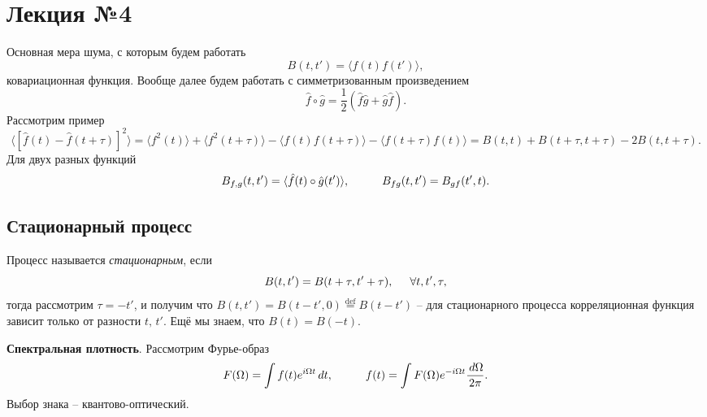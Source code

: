\section{Лекция №4}


Основная мера шума, с которым будем работать
\begin{equation*}
	B(t, t') = \langle f(t) f(t') \rangle,
\end{equation*}
ковариационная функция. Вообще далее будем работать с симметризованным произведением
\begin{equation*}
	\hat{f} \circ \hat{g} = \frac{1}{2}\left(\hat{f} \hat{g} + \hat{g} \hat{f}\right).
\end{equation*}
Рассмотрим пример
\begin{equation*}
	\langle [\hat{f}(t)-\hat{f}(t+\tau)]^2\rangle = \langle f^2 (t)\rangle + \langle f^2 (t+\tau)\rangle - \langle f(t) f(t+\tau)\rangle - \langle f(t+\tau) f(t)\rangle = B(t, t) + B(t+\tau, t+\tau) - 2 B(t, t+\tau).
\end{equation*}
Для двух разных функций
\begin{equation*}
	B_{f, g} (t, t') = \langle \hat{f}(t) \circ \hat{g}(t')\rangle,
	\hspace{10 mm} 
	B_{fg} (t, t') = B_{gf} (t', t).
\end{equation*}

\subsection*{Стационарный процесс}

Процесс называется \textit{стационарным}, если
\begin{equation*}
	B(t, t') = B(t + \tau, t' + \tau),
	\hspace{5 mm} \forall t, t', \tau,
\end{equation*}
тогда рассмотрим $\tau = - t'$, и получим что $B(t, t') = B(t-t', 0) \overset{\mathrm{def}}{=} B(t-t')$ -- для стационарного процесса корреляционная функция зависит только от разности $t,\, t'$. Ещё мы знаем, что $B(t) = B(-t)$. 

\textbf{Спектральная плотность}. Рассмотрим Фурье-образ
\begin{equation*}
	F(\Omega) = \int f(t) e^{i \Omega t} \d t,
	\hspace{10 mm} 
	f(t) = \int F(\Omega) e^{- i \Omega t} \frac{\d \Omega}{2\pi}.
\end{equation*}
Выбор знака -- квантово-оптический. 

